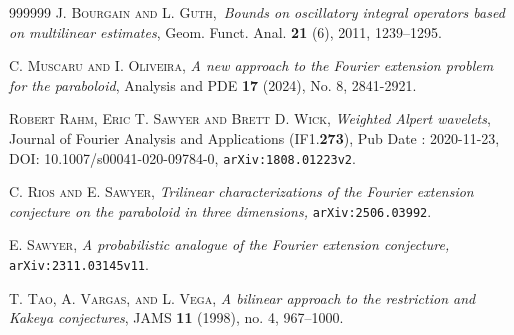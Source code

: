 \documentclass{amsart}%
\theoremstyle{plain}
\numberwithin{equation}{section}
\begin{document}
\begin{thebibliography}{999999}                                                                                           %
\textsc{J. Bourgain and L. Guth},\textit{\ Bounds on
oscillatory integral operators based on multilinear estimates}, Geom. Funct.
Anal. \textbf{21} (6), 2011, 1239--1295.

\textsc{C. Muscaru and I. Oliveira,} \textit{A new
approach to the Fourier extension problem for the paraboloid}, Analysis and
PDE \textbf{17} (2024), No. 8, 2841-2921.

\textsc{Robert Rahm, Eric T. Sawyer and Brett D.
Wick,} \textit{Weighted Alpert wavelets}, Journal of Fourier Analysis and
Applications (IF1.\textbf{273}), Pub Date : 2020-11-23, DOI:
10.1007/s00041-020-09784-0, \texttt{arXiv:1808.01223v2}.

\textsc{C. Rios and E. Sawyer,} \textit{Trilinear
characterizations of the Fourier extension conjecture on the paraboloid in
three dimensions, }\texttt{arXiv:2506.03992}.

\textsc{E. Sawyer,} \textit{A probabilistic analogue of
the Fourier extension conjecture, }\texttt{arXiv:2311.03145v11}.

\textsc{T. Tao, A. Vargas, and L. Vega}, \textit{A
bilinear approach to the restriction and Kakeya conjectures}, JAMS \textbf{11}
(1998), no. 4, 967--1000.
\end{thebibliography}
\end{document}
